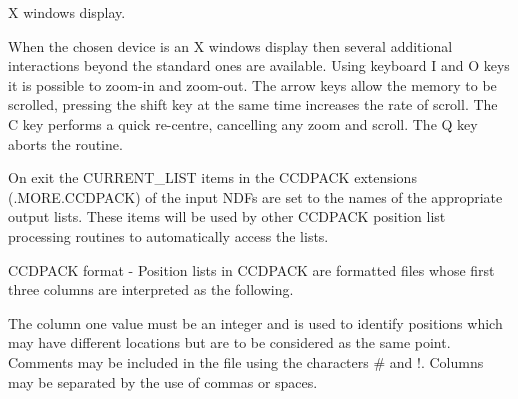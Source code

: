 {{{         \sstitem
         X windows display.

      }
        When the chosen device is an X windows
        display then several additional interactions beyond the standard
        ones are available. Using keyboard I and O keys it is possible
        to zoom-in and zoom-out. The arrow keys allow the memory to be
        scrolled, pressing the shift key at the same time increases the
        rate of scroll. The C key performs a quick re-centre, cancelling
        any zoom and scroll. The Q key aborts the routine.

        On exit the CURRENT\_LIST items in the CCDPACK extensions
        (.MORE.CCDPACK) of the input NDFs are set to the names of the
        appropriate output lists. These items will be used by other
        CCDPACK position list processing routines to automatically
        access the lists.

        CCDPACK format - Position lists in CCDPACK are formatted files
        whose first three columns are interpreted as the following.

        The column one value must be an integer and is used to identify
        positions which may have different locations but are to be
        considered as the same point. Comments may be included in the
        file using the characters \# and !. Columns may be separated by
        the use of commas or spaces.
   }
   }
